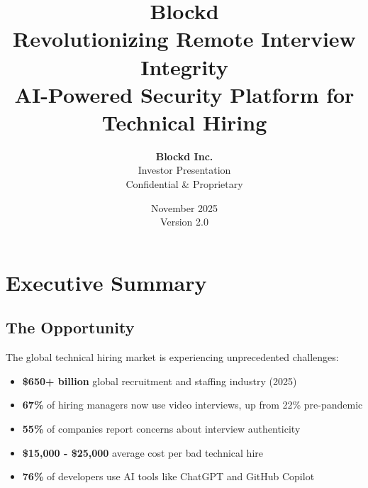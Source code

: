 \documentclass[11pt,letterpaper]{article}
\title{
    \Huge\textbf{\textcolor{blockdblue}{Blockd}}\\
    \vspace{0.5cm}
    \Large Revolutionizing Remote Interview Integrity\\
    \vspace{0.5cm}
    \large AI-Powered Security Platform for Technical Hiring\\
    \vspace{1.5cm}
}
\author{
    \textbf{Blockd Inc.}\\
    \vspace{0.3cm}
    Investor Presentation\\
    \vspace{0.3cm}
    \textcolor{blockdgray}{Confidential \& Proprietary}
}
\date{November 2025\\Version 2.0}
\begin{document}
\maketitle
\thispagestyle{empty}
\newpage

\thispagestyle{empty}
\vspace*{\fill}
\begin{center}
\end{center}
\vspace*{\fill}
\newpage

\tableofcontents
\newpage


\section{Executive Summary}

\subsection{The Opportunity}

The global technical hiring market is experiencing unprecedented challenges:

\begin{itemize}[noitemsep]
    \item \textbf{\$650+ billion} global recruitment and staffing industry (2025)\cite{qxglobal2025}
    \item \textbf{67\%} of hiring managers now use video interviews, up from 22\% pre-pandemic\cite{withe2024}
    \item \textbf{55\%} of companies report concerns about interview authenticity\cite{shrm2024}
    \item \textbf{\$15,000 - \$25,000} average cost per bad technical hire\cite{apollotechnical2025}
    \item \textbf{76\%} of developers use AI tools like ChatGPT and GitHub Copilot\cite{stackoverflow2024}
\end{itemize}
\end{document}
